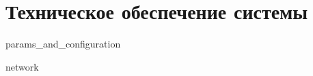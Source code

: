 \section{Техническое обеспечение системы}
\label{sec:hardware}

{params_and_configuration}

{network}

\newpage
